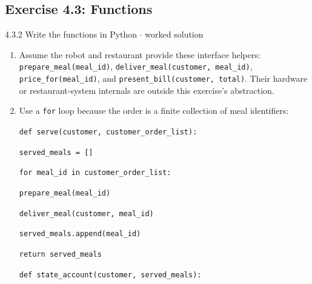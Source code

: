\documentclass[11pt]{article}
\begin{document}
\begin{keepsection}\subsection{Exercise 4.3: Functions}

\begin{workedbox}{4.3.2 Write the functions in Python \ensuremath{\cdot} worked solution}
\begin{enumerate}
\item Assume the robot and restaurant provide these interface helpers: \texttt{prepare\_meal(meal\_id)}, \texttt{deliver\_meal(customer, meal\_id)}, \texttt{price\_for(meal\_id)}, and \texttt{present\_bill(customer, total)}. Their hardware or restaurant-system internals are outside this exercise's abstraction.
\item {}
Use a \texttt{for} loop because the order is a finite collection of meal identifiers:
\begin{tcolorbox}[colback=Paperblue,colframe=Paperblue,boxrule=0pt,arc=0pt,left=7pt,right=7pt,top=5pt,bottom=5pt]\small\sloppy
\noindent\hspace*{0em}\texttt{def serve(customer, customer\_order\_list):}\par
\noindent\hspace*{1em}\texttt{served\_meals = []}\par
\noindent\hspace*{1em}\texttt{for meal\_id in customer\_order\_list:}\par
\noindent\hspace*{3em}\texttt{prepare\_meal(meal\_id)}\par
\noindent\hspace*{3em}\texttt{deliver\_meal(customer, meal\_id)}\par
\noindent\hspace*{3em}\texttt{served\_meals.append(meal\_id)}\par
\noindent\hspace*{1em}\texttt{return served\_meals}\par
\noindent\hspace*{0em}\texttt{}\par
\noindent\hspace*{0em}\texttt{}\par
\noindent\hspace*{0em}\texttt{def state\_account(customer, served\_meals):}\par

\end{tcolorbox}
\end{enumerate}
\end{workedbox}
\end{keepsection}
\end{document}
